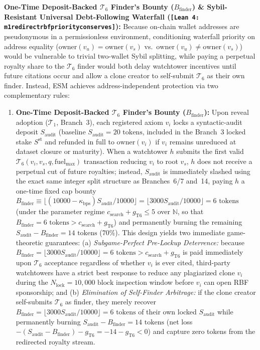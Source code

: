 \documentclass[runningheads,a4paper]{llncs}
\renewcommand{\_}{\textunderscore\allowbreak}
\newcommand{\leanref}[1]{{\footnotesize\texttt{[Lean 4: #1]}}}
\begin{document}
\textbf{One-Time Deposit-Backed $\mathcal{T}_6$ Finder's Bounty ($B_{\text{finder}}$) \& Sybil-Resistant Universal Debt-Following Waterfall (\leanref{m1\_redirect\_rbf\_priority\_conserves}):} Because on-chain wallet addresses are pseudonymous in a permissionless environment, conditioning waterfall priority on address equality ($\text{owner}(v_u) = \text{owner}(v_s)$ vs.\ $\text{owner}(v_u) \neq \text{owner}(v_s)$) would be vulnerable to trivial two-wallet Sybil splitting, while paying a perpetual royalty share to the $\mathcal{T}_6$ finder would both delay watchtower incentives until future citations occur and allow a clone creator to self-submit $\mathcal{T}_6$ as their own finder. Instead, ESM achieves address-independent protection via two complementary rules:
\begin{enumerate}
  \item \textbf{One-Time Deposit-Backed $\mathcal{T}_6$ Finder's Bounty ($B_{\text{finder}}$):} Upon reveal adoption ($\mathcal{T}_1$, Branch~3), each registered axiom $v_i$ locks a syntactic-audit deposit $S_{\text{audit}}$ (baseline $S_{\text{audit}} = 20\text{ tokens}$, included in the Branch~3 locked stake $S^{\text{st}}$ and refunded in full to $\text{owner}(v_i)$ if $v_i$ remains unreduced at dataset closure or maturity). When a watchtower $h$ submits the first valid $\mathcal{T}_6(v_i,\allowbreak v_s,\allowbreak q,\allowbreak \text{fuel}_{\max})$ transaction reducing $v_i$ to root $v_s$, $h$ does not receive a perpetual cut of future royalties; instead, $S_{\text{audit}}$ is immediately slashed using the exact same integer split structure as Branches~6/7 and~14, paying $h$ a one-time fixed cap bounty $B_{\text{finder}} \equiv \lfloor (10000 - \kappa_{\text{bps}}) S_{\text{audit}} / 10000 \rfloor = \lfloor 3000 S_{\text{audit}} / 10000 \rfloor = 6\text{ tokens}$ (under the parameter regime $c_{\text{search}} + g_{\text{T6}} \le 5$ over $\mathbb{N}$, so that $B_{\text{finder}} = 6\text{ tokens} > c_{\text{search}} + g_{\text{T6}}$) and permanently burning the remaining $S_{\text{audit}} - B_{\text{finder}} = 14\text{ tokens}$ ($70\%$). This design yields two immediate game-theoretic guarantees: (a) \emph{Subgame-Perfect Pre-Lockup Deterrence:} because $B_{\text{finder}} = \lfloor 3000 S_{\text{audit}} / 10000 \rfloor = 6\text{ tokens} > c_{\text{search}} + g_{\text{T6}}$ is paid immediately upon $\mathcal{T}_6$ acceptance regardless of whether $v_i$ is ever cited, third-party watchtowers have a strict best response to reduce any plagiarized clone $v_i$ during the $N_{\text{lock}} = 10,000\text{ block}$ inspection window before $v_i$ can open RBF sponsorship; and (b) \emph{Elimination of Self-Finder Arbitrage:} if the clone creator self-submits $\mathcal{T}_6$ as finder, they merely recover $B_{\text{finder}} = \lfloor 3000 S_{\text{audit}} / 10000 \rfloor = 6\text{ tokens}$ of their own locked $S_{\text{audit}}$ while permanently burning $S_{\text{audit}} - B_{\text{finder}} = 14\text{ tokens}$ (net loss $-(S_{\text{audit}} - B_{\text{finder}}) - g_{\text{T6}} = -14 - g_{\text{T6}} < 0$) and capture zero tokens from the redirected royalty stream.

\end{enumerate}
\end{document}
